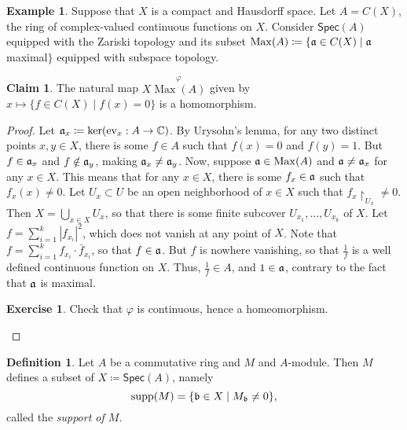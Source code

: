 \documentclass[10pt,letterpaper,cm]{nupset}
\theoremstyle{definition}
\newtheorem*{definition}{Definition}
\newtheorem{exmp}{Example}
\newtheorem{claim}{Claim}
\newtheorem{exercise}{Exercise}
\newcommand{\C}{\mathbb C}
\newcommand{\1}{\mathbf{1}}
\newcommand{\0}{\vec 0}
\DeclareMathOperator{\Max}{Max}
\DeclareMathOperator{\supp}{supp}
\begin{document}
\begin{exmp}
Suppose that $X$ is a compact and Hausdorff space. Let $A = C(X)$, the ring of complex-valued continuous functions on $X$. Consider $\mathsf{Spec}(A)$ equipped with the Zariski topology and its subset $\Max(A) \coloneqq  \{\frak{a} \in C(X) \mid \frak{a}$ maximal$\}$ equipped with subspace topology.
\begin{claim}
The natural map $X \overset{\varphi}{\Max(A)}$ given by $x \mapsto \{f\in C(X) \mid f(x) = 0\}$ is a homomorphism.
\end{claim}
\begin{proof}
Let $\frak{a}_x \coloneqq  \ker(\text{ev}_x : A \to \C)$.
By Urysohn's lemma, for any two distinct points $x,y \in X$, there is some $f\in A$ such that $f(x) = 0$ and $f(y) =1$. But $f \in \frak{a}_x$ and $f\notin \frak{a}_y$, making $\frak{a}_x \ne \frak{a}_y$.  Now, suppose $\frak{a} \in \Max(A)$ and $\frak{a} \ne \frak{a}_x$ for any $x\in X$. This means that for any $x\in X$, there is some $f_x \in \frak{a}$ such that $f_x(x) \ne 0$. Let $U_x \subset U$ be an open neighborhood of $x\in X$ such that $f_x \restriction_{U_x} \ne 0$.  Then $X = \bigcup_{x\in X} U_x$, so that there is some finite subcover $U_{x_1}, \ldots, U_{x_k}$ of $X$.  Let $f = \sum_{i=1}^k |f_{x_i}|^2$, which does not vanish at any point of $X$. Note that $f = \sum_{i=1}^k f_{x_i} \cdot \bar{f}_{x_i}$, so that $f\in \frak{a}$. But $f$ is nowhere vanishing, so that $\frac{1}{f}$ is a well defined continuous function on $X$. Thus, $\frac{1}{f} \in A$, and $1\in \frak{a}$, contrary to the fact that $\frak{a}$ is maximal. 
\begin{exercise}
Check that $\varphi$ is continuous, hence a homeomorphism. 
\end{exercise}
\end{proof}
\end{exmp}

\begin{definition}
Let $A$ be  a commutative ring and $M$ and $A$-module. Then $M$ defines a subset of $X\coloneqq  \mathsf{Spec}(A)$, namely $$\supp(M) = \{ \frak{b} \in X \mid M_{\frak{b}} \ne 0\},  $$ called the \textit{support of $M$}.
\end{definition}
\end{document}
